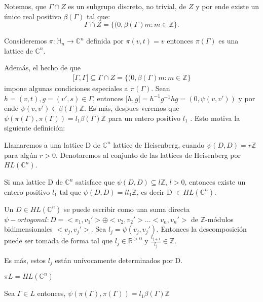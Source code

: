 \documentclass{beamer}
\begin{document}
\begin{frame}
 Notemos, que  $\Gamma \cap Z$ es un subgrupo discreto, no trivial, de $Z$ y 
por ende existe un único real positivo $\beta(\Gamma)$ tal que:
$$
\Gamma \cap Z=\{(0,\beta(\Gamma) m : m \in \mathbb{Z}\}.
$$

Consideremos $\pi :\mathbb{H}_{n}\rightarrow \mathbb{C}^{n}$  definida por $\pi (v,t)=v$
entonces $\pi(\Gamma)$ es una lattice de $\mathbb{C}^n$.

\end{frame}
\begin{frame}
 Además, el hecho de que
$$\begin{aligned}
{[} \Gamma,\Gamma {]} \subseteq \Gamma \cap Z = \{(0,\beta(\Gamma) m : m \in \mathbb{Z}\}
\end{aligned}$$
impone algunas condiciones especiales a $\pi(\Gamma)$.
Sean $h=(v,t),g=(v',s) \in \Gamma$, entonces ${[}h,g{]}=h^{-1}g^{-1}hg=(0,\psi(v,v'))$ 
y por ende $\psi(v,v') \in  \beta(\Gamma) \mathbb{Z}$.
Es más, despues veremos que $\psi(\pi(\Gamma),\pi(\Gamma))=l_1 \beta(\Gamma) \mathbb{Z}$ para un entero positivo $l_1$ .
Esto motiva la siguiente definición:

\begin{definition}
 Llamaremos a una lattice D de $\mathbb{C}^n$ lattice de Heisenberg, cuando $\psi(D,D)=r \mathbb{Z} $ para algún $r > 0$.
 Denotaremos al conjunto de las lattices de Heisenberg  por $HL(\mathbb{C}^n)$.
\end{definition}
\end{frame}
\begin{frame}
 \begin{lemma} \label{1.7}
 Si una lattice D de $\mathbb{C}^n$  satisface que $\psi(D,D) \subseteq  l \mathbb{Z}$, $l>0$, entonces 
 existe un entero positivo $l_1$ tal que $\psi (D,D)=l l_1 \mathbb{Z}$, es decir D $\in HL(\mathbb{C}^{n}).$
\end{lemma}

\begin{lemma} \label{1.8}
 Un $D \in HL(\mathbb{C}^n)$ se puede escribir como una suma directa $\psi-ortogonal : D=<v_1,v_1'>\oplus<v_2,v_2'>...<v_n,v_n'>$
 de $\mathbb{Z}$-módulos bidimensionales $<v_j,v_j'>$. Sea $l_j=\psi(v_j,v_j')$. Entonces la descomposición puede ser tomada 
 de forma tal que $l_j \in \mathbb{R}^{>0}$ y $\frac{l_{j+1}}{l_j}  \in \mathbb{Z}$.
 
 Es más, estos $l_j$ están unívocamente determinados por D.
\end{lemma}

\end{frame}
\begin{frame}
  \begin{corollary}
  $\pi L = HL(\mathbb{C}^n)$
 \end{corollary}
 \begin{corollary}
  Sea $\Gamma  \in L$ entonces, $\psi(\pi(\Gamma),\pi(\Gamma))=l_1 \beta(\Gamma) \mathbb{Z}$  
 \end{corollary} 
\end{frame}
\end{document}
